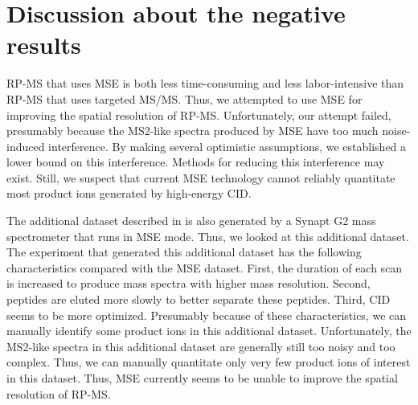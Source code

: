 \section{Discussion about the negative results}	

\Gls{RP-MS} that uses \gls{MSE} is both less time-consuming and less labor-intensive than \gls{RP-MS} that uses targeted \gls{MS/MS}.
Thus, we attempted to use \gls{MSE} for improving the spatial resolution of \gls{RP-MS}.
Unfortunately, our attempt failed, presumably because the \gls{MS2}-like spectra produced by \gls{MSE} have too much noise-induced interference.
By making several optimistic assumptions, we established a lower bound on this interference.
Methods for reducing this interference may exist.
Still, we suspect that current \gls{MSE} technology cannot reliably quantitate most product ions generated by high-energy \gls{CID}.

The additional dataset described in \cite{muntel2014comprehensive} is also generated by a Synapt G2 mass spectrometer that runs in \gls{MSE} mode.
Thus, we looked at this additional dataset.
The experiment that generated this additional dataset has the following characteristics compared with the \gls{MSE} dataset.
First, the duration of each scan is increased to produce mass spectra with higher mass resolution.
Second, peptides are eluted more slowly to better separate these peptides.
Third, \gls{CID} seems to be more optimized.
Presumably because of these characteristics, we can manually identify some product ions in this additional dataset.
Unfortunately, the \gls{MS2}-like spectra in this additional dataset are generally still too noisy and too complex. 
Thus, we can manually quantitate only very few product ions of interest in this dataset.
Thus, \gls{MSE} currently seems to be unable to improve the spatial resolution of \gls{RP-MS}.

\endgroup